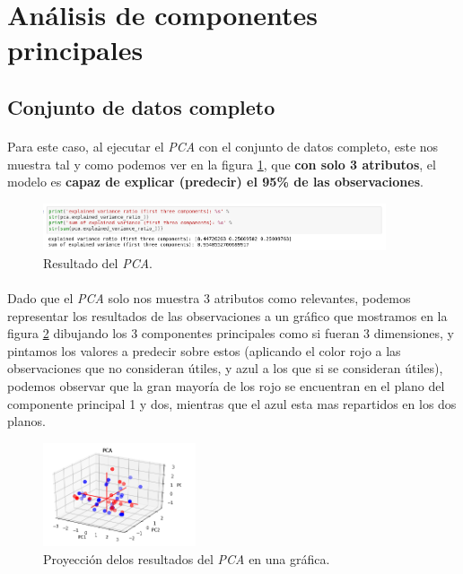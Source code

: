 \section{Análisis de componentes principales}
\label{resultados:pca}

\subsection{Conjunto de datos completo}

\paragraph{}
Para este caso, al ejecutar el \textit{PCA} con el conjunto de datos completo, este nos muestra tal y como podemos ver en la figura \ref{pcaOneResult}, que \textbf{con solo 3 atributos}, el modelo es \textbf{capaz de explicar (predecir) el 95\% de las observaciones}.

\begin{figure}[!htb]
  \centering
    \includegraphics[width=0.9\textwidth]{images/resultados_procesado_de_datos_pca1_result.png}
    \caption{Resultado del \textit{PCA}.}
  \label{pcaOneResult}
\end{figure}

\paragraph{}
Dado que el \textit{PCA} solo nos muestra 3 atributos como relevantes, podemos representar los resultados de las observaciones a un gráfico que mostramos en la figura \ref{pcaOneGraphic} dibujando los 3 componentes principales como si fueran 3 dimensiones, y pintamos los valores a predecir sobre estos (aplicando el color rojo a las observaciones que no consideran útiles, y azul a los que si se consideran útiles), podemos observar que la gran mayoría de los rojo se encuentran en el plano del componente principal 1 y dos, mientras que el azul esta mas repartidos en los dos planos.

\begin{figure}[!htb]
  \centering
    \includegraphics[width=0.4\textwidth]{images/resultados_procesado_de_datos_pca1_graphic.png}
    \caption{Proyección delos resultados del \textit{PCA} en una gráfica.}
  \label{pcaOneGraphic}
\end{figure}

